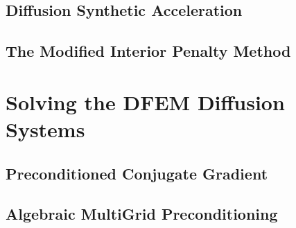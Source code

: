 \documentclass[preprint,review,12pt]{elsarticle}
\begin{document}

\subsection{Diffusion Synthetic Acceleration} \label{sec::accel_DSA}

\subsection{The Modified Interior Penalty Method} \label{sec::accel_MIP}

\section{Solving the DFEM Diffusion Systems} \label{sec::solving}

\subsection{Preconditioned Conjugate Gradient} \label{sec::solving_PCG}

\subsection{Algebraic MultiGrid Preconditioning} \label{sec::solving_AMG}
\end{document}
